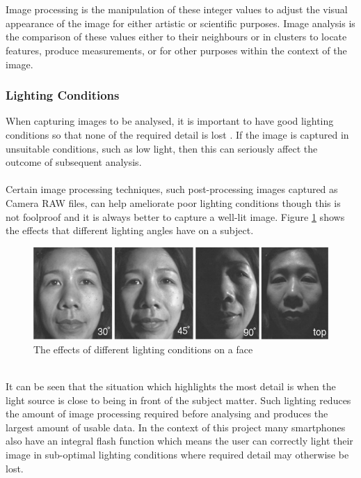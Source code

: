 		\\\\
		Image processing is the manipulation of these integer values to adjust the visual appearance of the image for either artistic or scientific purposes. Image analysis is the comparison of these values either to their neighbours or in clusters to locate features, produce measurements, or for other purposes within the context of the image.
	\subsubsection{Lighting Conditions}
		When capturing images to be analysed, it is important to have good lighting conditions so that none of the required detail is lost \citep{introtoprocessing}. If the image is captured in unsuitable conditions, such as low light, then this can seriously affect the outcome of subsequent analysis. 
		\\\\
		Certain image processing techniques, such post-processing images captured as Camera RAW files, can help ameliorate poor lighting conditions though this is not foolproof and it is always better to capture a well-lit image. Figure \ref{fig:illumination} shows the effects that different lighting angles have on a subject.
		\begin{figure}[h!]
			\centering
			\includegraphics[width=\linewidth]{../images/face_illumination.png}
			\caption[]{The effects of different lighting conditions on a face \citep{introtoprocessing}}
			\label{fig:illumination}
		\end{figure}\\
		It can be seen that the situation which highlights the most detail is when the light source is close to being in front of the subject matter. Such lighting reduces the amount of image processing required before analysing and produces the largest amount of usable data. In the context of this project many smartphones also have an integral flash function which means the user can correctly light their image in sub-optimal lighting conditions where required detail may otherwise be lost.
